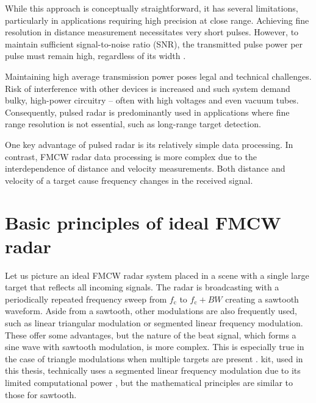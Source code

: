 While this approach is conceptually straightforward, it has several limitations, particularly in applications requiring high precision at close range.
Achieving fine resolution in distance measurement necessitates very short pulses.
However, to maintain sufficient signal-to-noise ratio (SNR), the transmitted pulse power per pulse must remain high, regardless of its width \cite{jankiraman2018}.

Maintaining high average transmission power poses legal and technical challenges.
Risk of interference with other devices is increased and such system demand bulky, high-power circuitry -- often with high voltages and even vacuum tubes.
Consequently, pulsed radar is predominantly used in applications where fine range resolution is not essential, such as long-range target detection.

One key advantage of pulsed radar is its relatively simple data processing.
In contrast, FMCW radar data processing is more complex due to the interdependence of distance and velocity measurements.
Both distance and velocity of a target cause frequency changes in the received signal.

\section{Basic principles of ideal FMCW radar}

Let us picture an ideal FMCW radar system placed in a scene with a single large target that reflects all incoming signals.
The radar is broadcasting with a periodically repeated frequency sweep from $f_\mathrm{c}$ to $f_\mathrm{c}+BW$ creating a sawtooth waveform.
Aside from a sawtooth, other modulations are also frequently used, such as linear triangular modulation or segmented linear frequency modulation.
These offer some advantages, but the nature of the beat signal, which forms a sine wave with sawtooth modulation, is more complex.
This is especially true in the case of triangle modulations when multiple targets are present \cite{jankiraman2018}.
\sirad kit, used in this thesis, technically uses a segmented linear frequency modulation due to its limited computational power \cite{siradPRO}, but the mathematical principles are similar to those for sawtooth.

